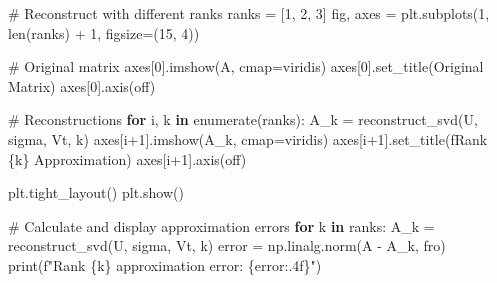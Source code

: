 \documentclass[
  letterpaper,
  DIV=11,
  numbers=noendperiod]{scrreprt}
\newenvironment{Shaded}{\begin{snugshade}}{\end{snugshade}}
\newcommand{\BuiltInTok}[1]{\textcolor[rgb]{0.00,0.23,0.31}{#1}}
\newcommand{\CommentTok}[1]{\textcolor[rgb]{0.37,0.37,0.37}{#1}}
\newcommand{\ControlFlowTok}[1]{\textcolor[rgb]{0.00,0.23,0.31}{\textbf{#1}}}
\newcommand{\DecValTok}[1]{\textcolor[rgb]{0.68,0.00,0.00}{#1}}
\newcommand{\KeywordTok}[1]{\textcolor[rgb]{0.00,0.23,0.31}{\textbf{#1}}}
\newcommand{\NormalTok}[1]{\textcolor[rgb]{0.00,0.23,0.31}{#1}}
\newcommand{\OperatorTok}[1]{\textcolor[rgb]{0.37,0.37,0.37}{#1}}
\newcommand{\SpecialCharTok}[1]{\textcolor[rgb]{0.37,0.37,0.37}{#1}}
\newcommand{\SpecialStringTok}[1]{\textcolor[rgb]{0.13,0.47,0.30}{#1}}
\newcommand{\StringTok}[1]{\textcolor[rgb]{0.13,0.47,0.30}{#1}}
\begin{document}
\begin{Shaded}
\begin{Highlighting}[]
\CommentTok{\# Reconstruct with different ranks}
\NormalTok{ranks }\OperatorTok{=}\NormalTok{ [}\DecValTok{1}\NormalTok{, }\DecValTok{2}\NormalTok{, }\DecValTok{3}\NormalTok{]}
\NormalTok{fig, axes }\OperatorTok{=}\NormalTok{ plt.subplots(}\DecValTok{1}\NormalTok{, }\BuiltInTok{len}\NormalTok{(ranks) }\OperatorTok{+} \DecValTok{1}\NormalTok{, figsize}\OperatorTok{=}\NormalTok{(}\DecValTok{15}\NormalTok{, }\DecValTok{4}\NormalTok{))}

\CommentTok{\# Original matrix}
\NormalTok{axes[}\DecValTok{0}\NormalTok{].imshow(A, cmap}\OperatorTok{=}\StringTok{\textquotesingle{}viridis\textquotesingle{}}\NormalTok{)}
\NormalTok{axes[}\DecValTok{0}\NormalTok{].set\_title(}\StringTok{\textquotesingle{}Original Matrix\textquotesingle{}}\NormalTok{)}
\NormalTok{axes[}\DecValTok{0}\NormalTok{].axis(}\StringTok{\textquotesingle{}off\textquotesingle{}}\NormalTok{)}

\CommentTok{\# Reconstructions}
\ControlFlowTok{for}\NormalTok{ i, k }\KeywordTok{in} \BuiltInTok{enumerate}\NormalTok{(ranks):}
\NormalTok{    A\_k }\OperatorTok{=}\NormalTok{ reconstruct\_svd(U, sigma, Vt, k)}
\NormalTok{    axes[i}\OperatorTok{+}\DecValTok{1}\NormalTok{].imshow(A\_k, cmap}\OperatorTok{=}\StringTok{\textquotesingle{}viridis\textquotesingle{}}\NormalTok{)}
\NormalTok{    axes[i}\OperatorTok{+}\DecValTok{1}\NormalTok{].set\_title(}\SpecialStringTok{f\textquotesingle{}Rank }\SpecialCharTok{\{}\NormalTok{k}\SpecialCharTok{\}}\SpecialStringTok{ Approximation\textquotesingle{}}\NormalTok{)}
\NormalTok{    axes[i}\OperatorTok{+}\DecValTok{1}\NormalTok{].axis(}\StringTok{\textquotesingle{}off\textquotesingle{}}\NormalTok{)}

\NormalTok{plt.tight\_layout()}
\NormalTok{plt.show()}

\CommentTok{\# Calculate and display approximation errors}
\ControlFlowTok{for}\NormalTok{ k }\KeywordTok{in}\NormalTok{ ranks:}
\NormalTok{    A\_k }\OperatorTok{=}\NormalTok{ reconstruct\_svd(U, sigma, Vt, k)}
\NormalTok{    error }\OperatorTok{=}\NormalTok{ np.linalg.norm(A }\OperatorTok{{-}}\NormalTok{ A\_k, }\StringTok{\textquotesingle{}fro\textquotesingle{}}\NormalTok{)}
    \BuiltInTok{print}\NormalTok{(}\SpecialStringTok{f"Rank }\SpecialCharTok{\{}\NormalTok{k}\SpecialCharTok{\}}\SpecialStringTok{ approximation error: }\SpecialCharTok{\{}\NormalTok{error}\SpecialCharTok{:.4f\}}\SpecialStringTok{"}\NormalTok{)}
\end{Highlighting}
\end{Shaded}
\end{document}
